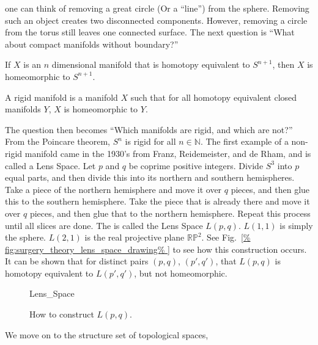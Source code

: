 \documentclass[crop=false,class=article,oneside]{standalone}
\begin{document}
        one can think of removing a great circle
        (Or a ``line'') from the sphere.
        Removing such an object creates two disconnected
        components. However, removing a circle from the
        torus still leaves one connected surface.
        The next question is
        ``What about compact manifolds without boundary?''
        \begin{theorem}
            If $X$ is an $n$ dimensional manifold that
            is homotopy equivalent to $S^{n+1}$, then $X$
            is homeomorphic to $S^{n+1}$.
        \end{theorem}
        \begin{definition}
            A rigid manifold is a manifold $X$ such that
            for all homotopy equivalent closed manifolds $Y$,
            $X$ is homeomorphic to $Y$.
        \end{definition}
        The question then becomes
        ``Which manifolds are rigid, and which are not?''
        From the Poincare theorem, $S^{n}$ is rigid for all
        $n\in\mathbb{N}$. The first example of a non-rigid
        manifold came in the 1930's from Franz, Reidemeister,
        and de Rham, and is called a Lens Space.
        Let $p$ and $q$ be coprime positive integers.
        Divide $S^{3}$ into $p$ equal parts, and then divide
        this into its northern and southern hemispheres.
        Take a piece of the northern hemisphere and move
        it over $q$ pieces, and then glue this to the
        southern hemisphere. Take the piece that is already
        there and move it over $q$ pieces, and then glue
        that to the northern hemisphere. Repeat this
        process until all slices are done. The is called
        the Lens Space $L(p,q)$. $L(1,1)$ is simply the
        sphere. $L(2,1)$ is the real projective plane
        $\mathbb{RP}^{2}$.
        See Fig.~\ref{%
            fig:surgery_theory_lens_space_drawing%
        }
        to see how this construction occurs.
        It can be shown that for distinct pairs
        $(p,q)$, $(p',q')$, that $L(p,q)$ is homotopy
        equivalent to $L(p',q')$, but not homeomorphic.
        \begin{figure}[H]
            \centering
            \captionsetup{type=figure}
            {Lens_Space}
            \caption{How to construct $L(p,q)$.}
            \label{fig:surgery_theory_lens_space_drawing}
        \end{figure}
        We move on to the structure set of topological spaces,
\end{document}
